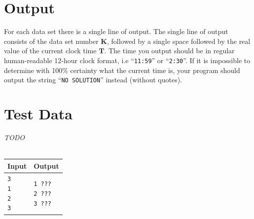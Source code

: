 \documentclass[11pt]{article}
\begin{document}
\section{Output}
For each data set there is a single line of output. The single line of output
consists of the data set number $\boldsymbol{K}$, followed by a single space
followed by the real value of the current clock time $\boldsymbol{T}$. The time you output
should be in regular human-readable 12-hour clock format, i.e ``\texttt{11:59}''
or ``\texttt{2:30}''. If it is impossible to determine with 100\% certainty
what the current time is, your program should output the string ``\texttt{NO SOLUTION}''
instead (without quotes).

\section{Test Data}
\emph{TODO}\\\\
\begin{tabularx}{\textwidth}{|X|X|}
	\hline
	Input & Output \\ \hline
	\parbox[t]{5cm}{
	\texttt{3\\
			1\\
			2\\
			3\\
	}} & \parbox[t]{5cm}{
	\texttt{1 ???\\
			2 ???\\
			3 ???\\
	}}\\
	\hline
\end{tabularx}
\end{document}
